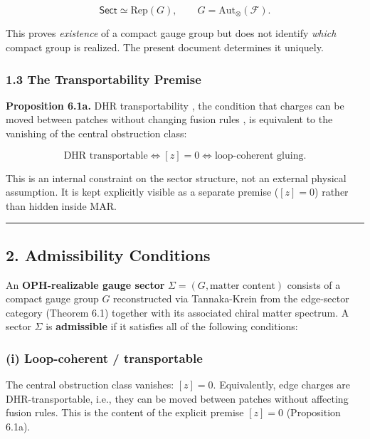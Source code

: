 \[\mathsf{Sect} \simeq \mathrm{Rep}(G), \qquad G = \mathrm{Aut}_\otimes(\mathcal{F}).\]

This proves \emph{existence} of a compact gauge group but does not identify \emph{which} compact group is realized. The present document determines it uniquely.

\subsubsection{1.3 The Transportability Premise}\label{13-the-transportability-premise}

\textbf{Proposition 6.1a.} DHR transportability , the condition that charges can be moved between patches without changing fusion rules , is equivalent to the vanishing of the central obstruction class:

\[\text{DHR transportable} \iff [z] = 0 \iff \text{loop-coherent gluing}.\]

This is an internal constraint on the sector structure, not an external physical assumption. It is kept explicitly visible as a separate premise (\([z]=0\)) rather than hidden inside MAR.

\begin{center}\rule{0.5\linewidth}{0.5pt}\end{center}

\subsection{2. Admissibility Conditions}\label{2-admissibility-conditions}

An \textbf{OPH-realizable gauge sector} \(\Sigma = (G, \text{matter content})\) consists of a compact gauge group \(G\) reconstructed via Tannaka-Krein from the edge-sector category (Theorem 6.1) together with its associated chiral matter spectrum. A sector \(\Sigma\) is \textbf{admissible} if it satisfies all of the following conditions:

\subsubsection{(i) Loop-coherent / transportable}\label{i-loop-coherent--transportable}

The central obstruction class vanishes: \([z] = 0\). Equivalently, edge charges are DHR-transportable, i.e., they can be moved between patches without affecting fusion rules. This is the content of the explicit premise \([z] = 0\) (Proposition 6.1a).

